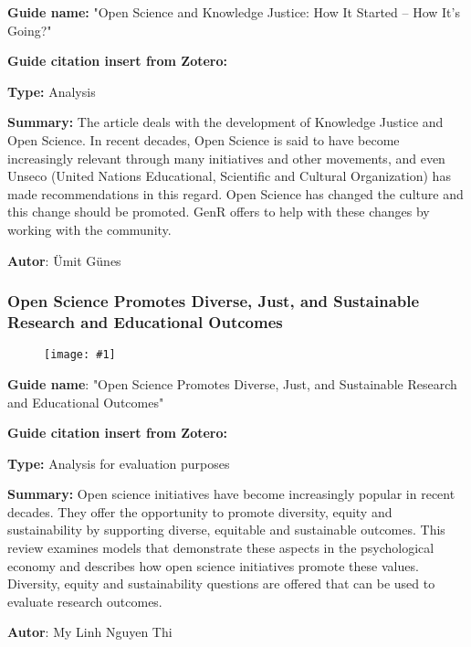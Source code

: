 \documentclass{article}
\newlength{\imgwidth}
\newcommand\scaledgraphics[2]{%
                
\settowidth{\imgwidth}{\texttt{[image: \#1]}}%
                
\setlength{\imgwidth}{\minof{\imgwidth}{#2\textwidth}}%
                
\texttt{[image: \#1]}%
                
}
\begin{document}
\textbf{Guide name:} "Open Science and Knowledge Justice: How It Started – How It’s Going?"


\textbf{Guide citation insert from Zotero:} \autocite{noauthor_open_2021}


\textbf{Type:} Analysis


\textbf{Summary:} The article deals with the development of Knowledge Justice and Open Science. In recent decades, Open Science is said to have become increasingly relevant through many initiatives and other movements, and even Unseco (United Nations Educational, Scientific and Cultural Organization) has made recommendations in this regard. Open Science has changed the culture and this change should be promoted. GenR offers to help with these changes by working with the community.


\textbf{Autor}: Ümit Günes


\subsubsection{Open Science Promotes Diverse, Just, and Sustainable Research and Educational Outcomes}\label{H4807510}


\begin{figure}
\scaledgraphics{23f9ee73-dda2-4a56-8083-4a618f9983b9.png}{1}
\label{F46402811}
\end{figure}





\textbf{Guide name}: "Open Science Promotes Diverse, Just, and Sustainable Research and Educational Outcomes"


\textbf{Guide citation insert from Zotero:} \autocite{grahe_open_2019}


\textbf{Type: }Analysis for evaluation purposes


\textbf{Summary:} Open science initiatives have become increasingly popular in recent decades. They offer the opportunity to promote diversity, equity and sustainability by supporting diverse, equitable and sustainable outcomes. This review examines models that demonstrate these aspects in the psychological economy and describes how open science initiatives promote these values. Diversity, equity and sustainability questions are offered that can be used to evaluate research outcomes.


\textbf{Autor}: My Linh Nguyen Thi


\printbibliography[title={Bibliography}]
\end{document}
